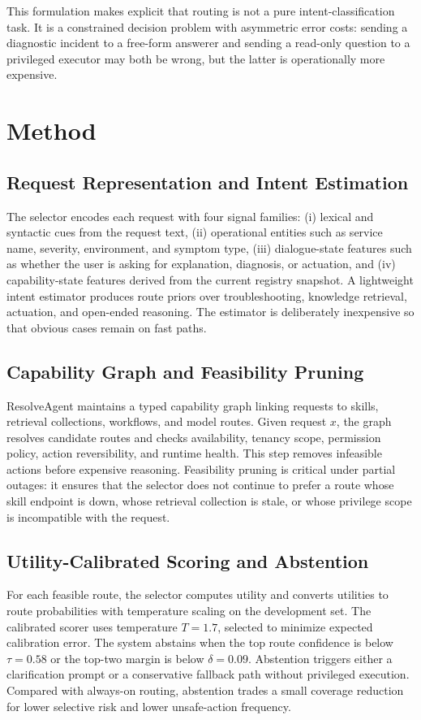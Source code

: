 \documentclass[conference]{IEEEtran}
\begin{document}
This formulation makes explicit that routing is not a pure intent-classification task. It is a constrained decision problem with asymmetric error costs: sending a diagnostic incident to a free-form answerer and sending a read-only question to a privileged executor may both be wrong, but the latter is operationally more expensive.

\section{Method}
\subsection{Request Representation and Intent Estimation}
The selector encodes each request with four signal families: (i) lexical and syntactic cues from the request text, (ii) operational entities such as service name, severity, environment, and symptom type, (iii) dialogue-state features such as whether the user is asking for explanation, diagnosis, or actuation, and (iv) capability-state features derived from the current registry snapshot. A lightweight intent estimator produces route priors over troubleshooting, knowledge retrieval, actuation, and open-ended reasoning. The estimator is deliberately inexpensive so that obvious cases remain on fast paths.

\subsection{Capability Graph and Feasibility Pruning}
ResolveAgent maintains a typed capability graph linking requests to skills, retrieval collections, workflows, and model routes. Given request $x$, the graph resolves candidate routes and checks availability, tenancy scope, permission policy, action reversibility, and runtime health. This step removes infeasible actions before expensive reasoning. Feasibility pruning is critical under partial outages: it ensures that the selector does not continue to prefer a route whose skill endpoint is down, whose retrieval collection is stale, or whose privilege scope is incompatible with the request.

\subsection{Utility-Calibrated Scoring and Abstention}
For each feasible route, the selector computes utility and converts utilities to route probabilities with temperature scaling on the development set. The calibrated scorer uses temperature $T=1.7$, selected to minimize expected calibration error. The system abstains when the top route confidence is below $\tau=0.58$ or the top-two margin is below $\delta=0.09$. Abstention triggers either a clarification prompt or a conservative fallback path without privileged execution. Compared with always-on routing, abstention trades a small coverage reduction for lower selective risk and lower unsafe-action frequency.
\end{document}
